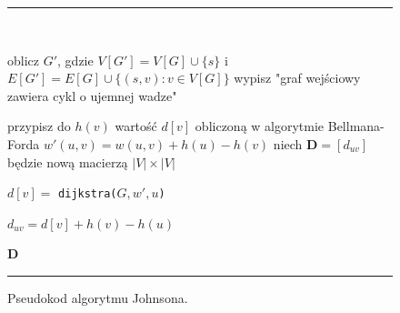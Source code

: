 \documentclass[12pt,a4paper]{book}
\newenvironment{myalgorithm}
{\rule{\textwidth}{0.5mm}\\\SetAlCapSty{}\SetAlgoNoEnd\SetAlgoNoLine\begin{algorithm}}{\end{algorithm}\rule{\textwidth}{0.5mm}}
\theoremstyle{definition}
\numberwithin{equation}{chapter}
\begin{document}
\begin{figure}[H]
\begin{myalgorithm}[H]
	\DontPrintSemicolon
	{
		oblicz $G'$, gdzie $V[G'] = V[G] \cup \{s\}$ i $E[G'] = E[G] \cup \big\{(s,v): v \in V[G]\big\}$\;
		{
			wypisz "graf wejściowy zawiera cykl o ujemnej wadze"\;
			\Return
		}
		\Else
		{
			{
				przypisz do $h(v)$ wartość $d[v]$ obliczoną w algorytmie Bellmana-Forda\;
			}
			{
				$w'(u, v) = w(u, v) + h(u) - h(v)$\;
			}
			niech $\mathbf{D} = [d_{uv}]$ będzie nową macierzą $|V|\times|V|$\;
			{
				$d[v] = $ \texttt{dijkstra($G, w', u$)}\;

				{
				$d_{u v} = d[v] + h(v) - h(u)$\;
				}
			}
		}
		\Return $\mathbf{D}$\;
	}
\end{myalgorithm}
\caption{Pseudokod algorytmu Johnsona.}
\label{Johnson_pseudokod}
\end{figure}
\end{document}
